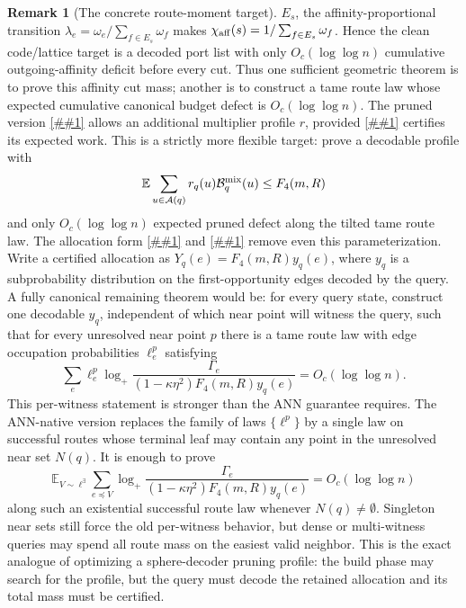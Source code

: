 \documentclass[10pt]{article}
\newcommand{\cref}[1]{\ref{##1}}
\theoremstyle{definition}
\newtheorem{remark}[theorem]{Remark}
\newcommand{\E}{\mathbb{E}}
\begin{document}
\begin{remark}[The concrete route-moment target]
   \(E_s\), the affinity-proportional transition
   \(\lambda_e=\omega_e/\sum_{f\in E_s}\omega_f\) makes
   \(\chi_{\rm aff}(s)=1/\sum_{f\in E_s}\omega_f\).  Hence the clean
   code/lattice target is a decoded port list with only
   \(O_c(\log\log n)\) cumulative outgoing-affinity deficit before every cut.
   Thus one sufficient geometric theorem is to prove this affinity cut mass;
   another is to construct a tame route law whose expected cumulative
   canonical budget defect is \(O_c(\log\log n)\).
   The pruned version \cref{cor:pruned-budget-defect-toll} allows an
   additional multiplier profile \(r\), provided
   \cref{lem:pruned-budget-thinning} certifies its expected work.  This is a
   strictly more flexible target: prove a decodable profile with
   \[
      \E\sum_{u\in\mathcal A(q)}r_q(u)\mathcal B_q^{\rm mix}(u)
      \le F_4(m,R)
   \]
   and only \(O_c(\log\log n)\) expected pruned defect along the tilted tame
   route law.
   The allocation form \cref{lem:budget-allocation-thinning} and
   \cref{cor:allocation-defect-toll} remove even this parameterization.  Write
   a certified allocation as
   \(Y_q(e)=F_4(m,R)y_q(e)\), where \(y_q\) is a subprobability distribution on
   the first-opportunity edges decoded by the query.  A fully canonical
   remaining theorem would be: for every query state, construct one decodable
   \(y_q\), independent of which near point will witness the query, such that
   for every unresolved near point \(p\) there is a tame route law with edge
   occupation probabilities \(\ell^p_e\) satisfying
   \[
      \sum_e\ell^p_e
      \log_+
      \frac{\Gamma_e}
           {(1-\kappa\eta^2)F_4(m,R)y_q(e)}
      =
      O_c(\log\log n).
   \]
   This per-witness statement is stronger than the ANN guarantee requires.
   The ANN-native version replaces the family of laws \(\{\ell^p\}\) by a
   single law on successful routes whose terminal leaf may contain any point in
   the unresolved near set \(N(q)\).  It is enough to prove
   \[
      \E_{V\sim\ell^{\exists}}
      \sum_{e\preceq V}
      \log_+
      \frac{\Gamma_e}
           {(1-\kappa\eta^2)F_4(m,R)y_q(e)}
      =
      O_c(\log\log n)
   \]
   along such an existential successful route law whenever \(N(q)\ne\emptyset\).
   Singleton near sets still force the old per-witness behavior, but dense or
   multi-witness queries may spend all route mass on the easiest valid neighbor.
   This is the exact analogue of optimizing a sphere-decoder pruning profile:
   the build phase may search for the profile, but the query must decode the
   retained allocation and its total mass must be certified.

\end{remark}
\end{document}
